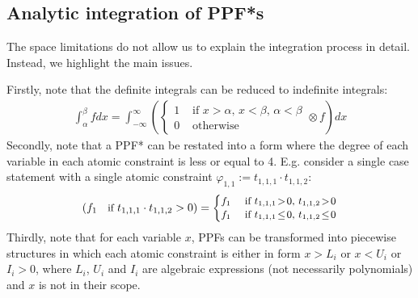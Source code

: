 \documentclass{article}
\newcommand{\case}[2]{#2 &\text{ if } #1}%
\newcommand{\otherwise}[1]{#1 &\text{ otherwise}}
\begin{document}
{%

\subsection{Analytic integration of PPF*s}
The space limitations do not allow us to explain the integration process in detail. 
Instead, we highlight the main issues.

Firstly, note that the definite integrals can be reduced to indefinite integrals:
{
\footnotesize\vspace{-0.5mm}
\begin{align*}
\int_{\alpha}^{\beta} f dx  = 
\int_{-\infty}^{\infty}
\left (
  \begin{cases}
  \case{x\!>\!\alpha,\, x\!<\!\beta,\, \alpha \!<\! \beta}{1}\\
 \otherwise{0}    
  \end{cases}
\otimes
  f
\right)
dx
\end{align*}
}
Secondly, note that a PPF* can be restated into a form where
the degree of each variable in each atomic constraint is less or equal to 4.
E.g. consider a single case statement with a single atomic constraint 
$\varphi_{1,1} := t_{1,1,1} \cdot t_{1,1,2}$:%
\begin{align*}
{\footnotesize\vspace{-0.5mm}
\left(
f_1 \quad \text{if } t_{1,1,1} \cdot t_{1,1,2} > 0
\right)
 =
\begin{cases}
  \case{t_{1,1,1} \!>\! 0, \, t_{1,1,2} \!>\! 0 }{f_1} \\ 
  \case{t_{1,1,1} \!\leq\! 0, \, t_{1,1,2} \!\leq\! 0 }{f_1} 
 \end{cases} 
}
\end{align*}
Thirdly, note that for each variable $x$, 
PPFs can be transformed into piecewise structures 
in which each atomic constraint is either in form $x>L_i$ or $x<U_i$ or $I_i>0$, 
where $L_i$, $U_i$ and $I_i$ are 
algebraic expressions (not necessarily polynomials) and $x$ is not in their scope. 
}
\end{document}
